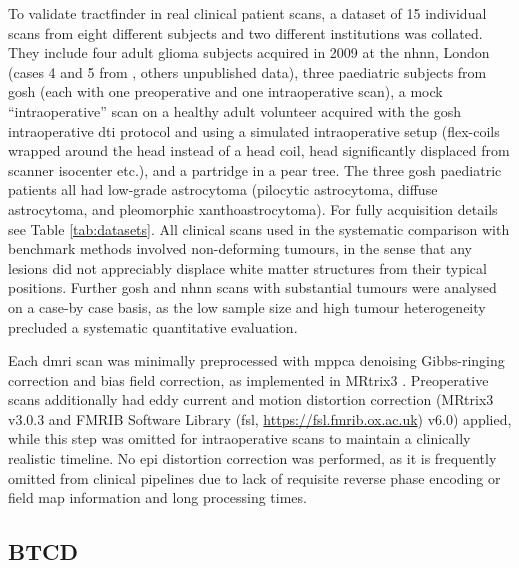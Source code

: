 To validate tractfinder in real clinical patient scans, a dataset of 15 individual scans from eight different subjects and two different institutions was collated.
They include four adult glioma subjects acquired in 2009 at the \gls{nhnn}, London (cases 4 and 5 from \textcite{Mancini2022}, others unpublished data),
three paediatric subjects from \gls{gosh} (each with one preoperative and one intraoperative scan),
a mock “intraoperative” scan on a healthy adult volunteer acquired with the \gls{gosh} intraoperative \gls{dti} protocol and using a simulated intraoperative setup (flex-coils wrapped around the head instead of a head coil, head significantly displaced from scanner isocenter etc.),
and a partridge in a pear tree.
The three \gls{gosh} paediatric patients all had low-grade astrocytoma (pilocytic astrocytoma, diffuse astrocytoma, and pleomorphic xanthoastrocytoma).
For fully acquisition details see Table \ref{tab:datasets}.
All clinical scans used in the systematic comparison with benchmark methods involved non-deforming tumours, in the sense that any lesions did not appreciably displace white matter structures from their typical positions.
Further \gls{gosh} and \gls{nhnn} scans with substantial tumours were analysed on a case-by case basis, as the low sample size and high tumour heterogeneity precluded a systematic quantitative evaluation.

Each \gls{dmri} scan was minimally preprocessed with \gls{mppca} denoising\autocite{Veraart2016, Cordero-Grande2019} Gibbs-ringing correction\autocite{Kellner2016} and bias field correction\autocite{Zhang2001, Smith2004}, as implemented in MRtrix3 \autocite{Tournier2019}.
Preoperative scans additionally had eddy current and motion distortion correction\autocite{Andersson2016a, Smith2004} (MRtrix3 v3.0.3 and FMRIB Software Library (\gls{fsl}, \url{https://fsl.fmrib.ox.ac.uk}) v6.0) applied, while this step was omitted for intraoperative scans to maintain a clinically realistic timeline.
No \gls{epi} distortion correction was performed, as it is frequently omitted from clinical pipelines due to lack of requisite reverse phase encoding or field map information and long processing times\autocite{Yang2022}.

\subsection{BTCD}
\label{sec:data_btcd}

